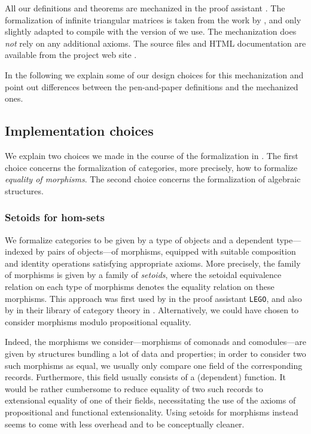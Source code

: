 \documentclass{amsart}
\begin{document}
All our definitions and theorems are mechanized in the proof assistant \coq \parencite{coq84pl3}.
The formalization of infinite triangular matrices is taken from the work by \textcite{DBLP:conf/types/MatthesP11},
and only slightly adapted to compile with the version of \coq we use.
The mechanization does \emph{not} rely on any additional axioms.
The \coq source files and HTML documentation are available from the project web site \parencite{trimat_coq}.

In the following we explain some of our design choices for this mechanization
and point out differences between the pen-and-paper definitions and the mechanized ones.



\subsection{Implementation choices}

We explain two choices we made in the course of the formalization in \coq. The first choice concerns
the formalization of categories, more precisely, how to formalize \emph{equality of morphisms}.
The second choice concerns the formalization of algebraic structures.

\subsubsection{Setoids for hom-sets}
We formalize categories to be given by a type of objects and a dependent type---indexed by pairs of objects---of morphisms,
equipped with suitable composition and identity operations satisfying appropriate axioms.
More precisely, the family of morphisms is given by a family of \emph{setoids}, where the setoidal equivalence relation on each
type of morphisms denotes the equality relation on these morphisms. This approach was first used by
\textcite{aczel_galois} in the proof assistant \texttt{LEGO}, and also by \textcite{concat}  in their library
of category theory in \coq.
Alternatively, we could have chosen to consider morphisms modulo propositional equality.

Indeed, the morphisms we consider---morphisms of comonads and comodules---are given by structures
bundling a lot of data and properties; in order to consider two such morphisms as equal, we usually only compare one field of the 
corresponding records. Furthermore, this field usually consists of a (dependent) function.
It would be rather cumbersome to reduce equality of two such records to extensional equality of one of their fields, 
necessitating the use of the axioms of propositional and functional extensionality.
Using setoids for morphisms instead seems to come with less overhead and to be conceptually cleaner.
\end{document}
